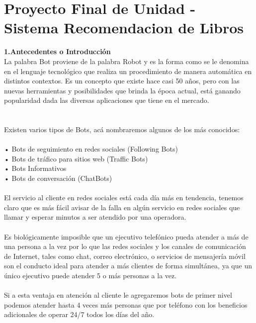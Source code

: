 \section{Proyecto Final de Unidad -  Sistema Recomendacion de Libros} 
\begin{flushleft}

\begin{itemize}
\textbf{1.Antecedentes o Introducción}\\


La palabra Bot proviene de la palabra Robot y es la forma como se le denomina en el lenguaje tecnológico que realiza un procedimiento de manera automática en distintos contextos.
Es un concepto que existe hace casi 50 años, pero con las nuevas herramientas y posibilidades que brinda la época actual, está ganando popularidad dada las diversas aplicaciones que tiene en el mercado.\textbf{ }\\
\textbf{ }\\
\textbf{ }\\
Existen varios tipos de Bots, acá nombraremos algunos de los más conocidos: \textbf{ }\\
\textbf{ }\\
•	Bots de seguimiento en redes sociales (Following Bots)\textbf{ }\\
•	Bots de tráfico para sitios web (Traffic Bots)\textbf{ }\\
•	Bots Informativos\textbf{ }\\
•	Bots de conversación (ChatBots)\textbf{ }\\
\textbf{ }\\
El servicio al cliente en redes sociales está cada día más en tendencia, tenemos claro que es más fácil avisar de la falla en algún servicio en redes sociales que llamar y esperar minutos a ser atendido por una operadora.\textbf{ }\\
\textbf{ }\\
Es biológicamente imposible que un ejecutivo telefónico pueda atender a más de una persona a la vez por lo que las redes sociales y los canales de comunicación de Internet, tales como chat, correo electrónico, o servicios de mensajería móvil son el conducto ideal para atender a más clientes de forma simultánea, ya que un único ejecutivo puede atender 5 o más personas a la vez.\textbf{ }\\
\textbf{ }\\
Si a esta ventaja en atención al cliente le agregaremos bots de primer nivel podemos atender hasta 4 veces más personas que por teléfono con los beneficios adicionales de operar 24/7 todos los días del año.\textbf{ }\\

\end{itemize}
\end{flushleft}
